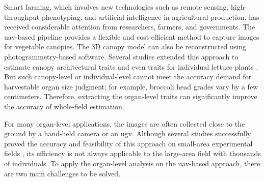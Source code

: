 
Smart farming, which involves new technologies such as remote sensing, high-throughput phenotyping, and artificial intelligence in agricultural production, has received considerable attention from researchers, farmers, and governments. The \gls{uav}-based pipeline provides a flexible and cost-efficient method to capture images for vegetable canopies. The 3D canopy model can also be reconstructed using photogrammetry-based software. Several studies extended this approach to estimate canopy architectural traits \citep{shu_application_2021, wang_detection_2021, herrero_canopy_2020} and even traits for individual lettuce plants \citep{bauer_combining_2019}. But such canopy-level or individual-level cannot meet the accuracy demand for harvestable organ size judgment; for example, broccoli head grades vary by a few centimeters. Therefore, extracting the organ-level traits can significantly improve the accuracy of whole-field estimation.

For many organ-level applications, the images are often collected close to the ground by a hand-held camera or an \gls{ugv}. Although several studies successfully proved the accuracy and feasibility of this approach on small-area experimental fields \citep{luling_using_2021,garcia_towards_2021,blok_effect_2021}, its efficiency is not always applicable to the large-area field with thousands of individuals. To apply the organ-level analysis on the \gls{uav}-based approach, there are two main challenges to be solved.

